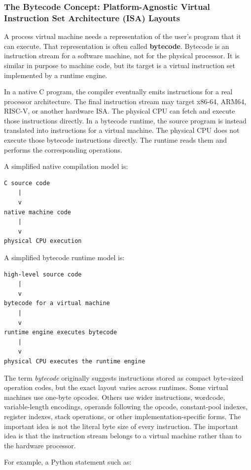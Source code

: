 \subsubsection{The Bytecode Concept: Platform-Agnostic Virtual Instruction Set Architecture (ISA) Layouts}

A process virtual machine needs a representation of the user's program that it can execute. That representation is often called \textbf{bytecode}. Bytecode is an instruction stream for a software machine, not for the physical processor. It is similar in purpose to machine code, but its target is a virtual instruction set implemented by a runtime engine.

In a native C program, the compiler eventually emits instructions for a real processor architecture. The final instruction stream may target x86-64, ARM64, RISC-V, or another hardware ISA. The physical CPU can fetch and execute those instructions directly. In a bytecode runtime, the source program is instead translated into instructions for a virtual machine. The physical CPU does not execute those bytecode instructions directly. The runtime reads them and performs the corresponding operations.

A simplified native compilation model is:

\begin{verbatim}
C source code
    |
    v
native machine code
    |
    v
physical CPU execution
\end{verbatim}

A simplified bytecode runtime model is:

\begin{verbatim}
high-level source code
    |
    v
bytecode for a virtual machine
    |
    v
runtime engine executes bytecode
    |
    v
physical CPU executes the runtime engine
\end{verbatim}

The term \emph{bytecode} originally suggests instructions stored as compact byte-sized operation codes, but the exact layout varies across runtimes. Some virtual machines use one-byte opcodes. Others use wider instructions, wordcode, variable-length encodings, operands following the opcode, constant-pool indexes, register indexes, stack operations, or other implementation-specific forms. The important idea is not the literal byte size of every instruction. The important idea is that the instruction stream belongs to a virtual machine rather than to the hardware processor.

For example, a Python statement such as:

